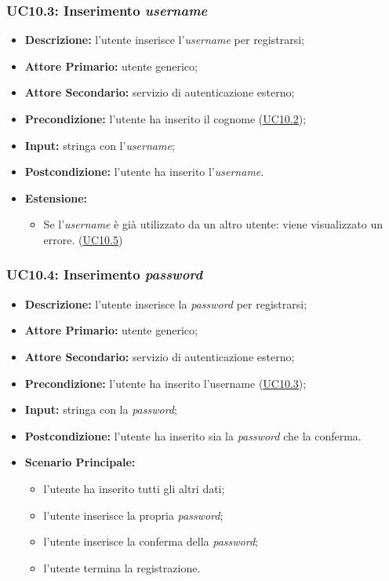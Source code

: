 \subsubsection{UC10.3: Inserimento \textit{username}}
\label{sec:UC10.3}
\begin{itemize}
    \item \textbf{Descrizione:} l'utente inserisce l'\textit{username} per registrarsi;
    \item \textbf{Attore Primario:} utente generico;
    \item \textbf{Attore Secondario:} servizio di autenticazione esterno;
    \item \textbf{Precondizione:} l'utente ha inserito il cognome (\hyperref[sec:UC10.2]{\underline{UC10.2}});
    \item \textbf{Input:} stringa con l'\textit{username};
    \item \textbf{Postcondizione:} l'utente ha inserito l'\textit{username}.
    \item \textbf{Estensione:} 
    \begin{itemize}
        \item Se l'\textit{username} è già utilizzato da un altro utente: viene visualizzato un errore. (\hyperref[sec:UC10.5]{\underline{UC10.5}}) 
    \end{itemize} 
\end{itemize}

\subsubsection{UC10.4: Inserimento \textit{password}}
\label{sec:UC10.4}
\begin{itemize}
    \item \textbf{Descrizione:} l'utente inserisce la \textit{password} per registrarsi;
    \item \textbf{Attore Primario:} utente generico;
    \item \textbf{Attore Secondario:} servizio di autenticazione esterno;
    \item \textbf{Precondizione:} l'utente ha inserito l'username (\hyperref[sec:UC10.3]{\underline{UC10.3}});
    \item \textbf{Input:} stringa con la \textit{password};
    \item \textbf{Postcondizione:} l'utente ha inserito sia la \textit{password} che la conferma.
    \item \textbf{Scenario Principale:}
        \begin{itemize}
            \item l'utente ha inserito tutti gli altri dati;
            \item l'utente inserisce la propria \textit{password};
            \item l'utente inserisce la conferma della \textit{password};
            \item l'utente termina la registrazione.
        \end{itemize} 
\end{itemize}

